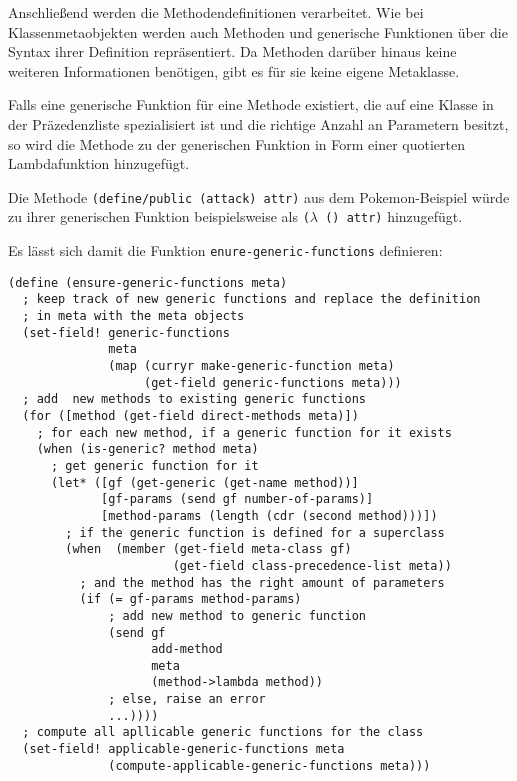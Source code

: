 Anschließend werden die Methodendefinitionen verarbeitet. Wie bei Klas\-sen\-me\-ta\-ob\-jek\-ten werden auch Methoden und generische Funktionen über die Syntax ihrer Definition repräsentiert. Da Methoden darüber hinaus keine weiteren Informationen benötigen, gibt es für sie keine eigene Metaklasse. 

Falls eine generische Funktion für eine Methode existiert, die auf eine Klasse in der Präzedenzliste spezialisiert ist und die richtige Anzahl an Parametern besitzt, so wird die Methode zu der generischen Funktion in Form einer quotierten Lambdafunktion hinzugefügt. 

Die Methode \texttt{(define/public (attack) {\textquotesingle}attr)} aus dem Pokemon-Beispiel würde zu ihrer generischen Funktion beispielsweise als \texttt{($\lambda$ () {\textquotesingle}attr)} hinzugefügt. 

Es lässt sich damit die Funktion \texttt{enure-generic-functions} definieren:

\begin{lstlisting}
(define (ensure-generic-functions meta)
  ; keep track of new generic functions and replace the definition
  ; in meta with the meta objects
  (set-field! generic-functions
              meta
              (map (curryr make-generic-function meta)
                   (get-field generic-functions meta)))
  ; add  new methods to existing generic functions
  (for ([method (get-field direct-methods meta)])
    ; for each new method, if a generic function for it exists
    (when (is-generic? method meta)
      ; get generic function for it
      (let* ([gf (get-generic (get-name method))]
             [gf-params (send gf number-of-params)]
             [method-params (length (cdr (second method)))])
        ; if the generic function is defined for a superclass
        (when  (member (get-field meta-class gf)
                       (get-field class-precedence-list meta))
          ; and the method has the right amount of parameters
          (if (= gf-params method-params)
              ; add new method to generic function
              (send gf
                    add-method
                    meta
                    (method->lambda method))
              ; else, raise an error
              ...))))
  ; compute all apllicable generic functions for the class
  (set-field! applicable-generic-functions meta
              (compute-applicable-generic-functions meta)))
\end{lstlisting}

